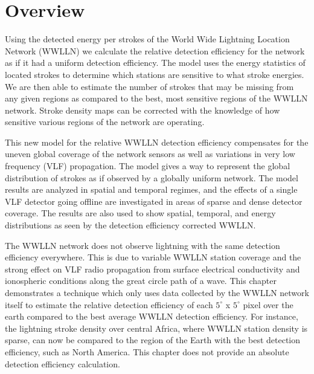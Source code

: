 \section{Overview}

Using the detected energy per strokes of the World Wide Lightning Location Network (WWLLN) we calculate the relative detection efficiency for the network as if it had a uniform  detection efficiency.
The model uses the energy statistics of located strokes to determine which stations are sensitive to what stroke energies.
We are then able to estimate the number of strokes that may be missing from any given regions as compared to the best, most sensitive regions of the WWLLN network.
Stroke density maps can be corrected with the knowledge of how sensitive various regions of the network are operating.

This new model for the relative WWLLN detection efficiency compensates for the uneven global coverage of the network sensors as well as variations in very low frequency (VLF) propagation.
The model gives a way to represent the global distribution of strokes as if observed by a globally uniform network.
The model results are analyzed in spatial and temporal regimes, and the effects of a single VLF detector going offline are investigated in areas of sparse and dense detector coverage.
The results are also used to show spatial, temporal, and energy distributions as seen by the detection efficiency corrected WWLLN.

The WWLLN network does not observe lightning with the same detection efficiency everywhere.
This is due to variable WWLLN station coverage and the strong effect on VLF radio propagation from surface electrical conductivity and ionospheric conditions along the great circle path of a wave.
This chapter demonstrates a technique which only uses data collected by the WWLLN network itself to estimate the relative detection efficiency of each $5^\circ$ x $5^\circ$ pixel over the earth compared to the best average WWLLN detection efficiency.
For instance, the lightning stroke density over central Africa, where WWLLN station density is sparse, can now be compared to the region of the Earth with the best detection efficiency, such as North America.
This chapter does not provide an absolute detection efficiency calculation.

